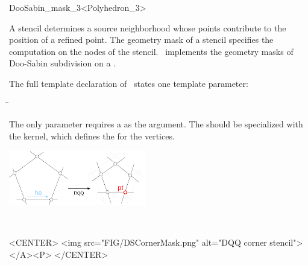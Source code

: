\begin{ccRefClass}{DooSabin_mask_3<Polyhedron_3>}

\ccDefinition

A stencil determines a source neighborhood 
whose points contribute to the position of a refined point.
The geometry mask of a stencil specifies
the computation on the nodes of the stencil.
\ccClassTemplateName\ implements the geometry masks of 
Doo-Sabin subdivision on a .


\ccParameters

The full template declaration of \ccClassTemplateName\ states one
template parameter:

\begin{tabbing}
 \= 
\end{tabbing}
   
The only parameter requires a  as the argument. The
 should be specialized with the 
kernel, which defines the  for the vertices.

\ccCreation
{}


\ccThreeToTwo


\begin{ccTexOnly}
  \begin{center}
    \parbox{0.6\textwidth}{%
      \includegraphics[width=0.45\textwidth]{Subdivision_method_3_ref/FIG/DSCornerMask}%
    }\\ \vspace{0.5cm}
  \end{center}
\end{ccTexOnly}

\begin{ccHtmlOnly}
    <CENTER>
      <img src="FIG/DSCornerMask.png" alt="DQQ corner stencil"></A><P>
    </CENTER>
\end{ccHtmlOnly}

\ccSeeAlso

\\

\end{ccRefClass}

